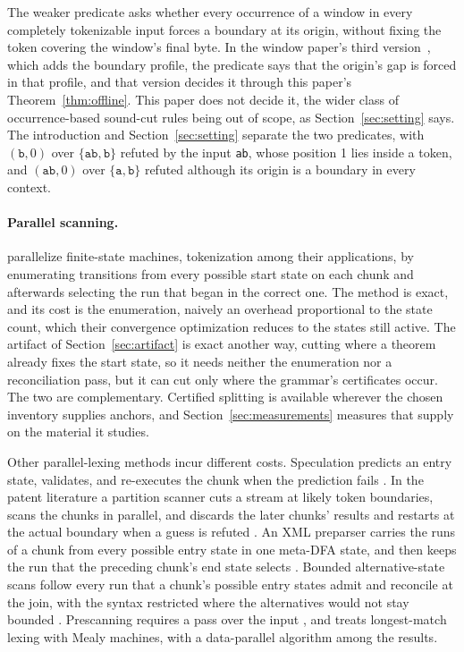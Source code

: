 \documentclass[11pt,a4paper]{article}
\theoremstyle{definition}
\theoremstyle{plain}
\newcommand{\code}[1]{\texttt{#1}}
\begin{document}
The weaker predicate asks whether every occurrence of a window in every completely tokenizable input forces a boundary
at its origin, without fixing the token covering the window's final byte. In the window paper's third
version~\citep{nidhogg2026splitwindows}, which adds the boundary profile, the predicate says that the origin's gap is
forced in that profile, and that version decides it through this paper's Theorem~\ref{thm:offline}. This paper does not
decide it, the wider class of occurrence-based sound-cut rules being out of scope, as Section~\ref{sec:setting} says.
The introduction and Section~\ref{sec:setting} separate the two predicates, with $(\code{b}, 0)$ over
$\{\code{ab}, \code{b}\}$ refuted by the input \code{ab}, whose position 1 lies inside a token, and $(\code{ab}, 0)$
over $\{\code{a}, \code{b}\}$ refuted although its origin is a boundary in every context.

\paragraph{Parallel scanning.} \citet{mytkowicz2014dataparallel} parallelize finite-state machines, tokenization among
their applications, by enumerating transitions from every possible start state on each chunk and afterwards selecting
the run that began in the correct one. The method is exact, and its cost is the enumeration, naively an overhead
proportional to the state count, which their convergence optimization reduces to the states still active. The artifact
of Section~\ref{sec:artifact} is exact another way, cutting where a theorem already fixes the start state, so it needs
neither the enumeration nor a reconciliation pass, but it can cut only where the grammar's certificates occur. The two
are complementary. Certified splitting is available wherever the chosen inventory supplies anchors, and
Section~\ref{sec:measurements} measures that supply on the material it studies.

Other parallel-lexing methods incur different costs. Speculation predicts an entry state, validates, and re-executes the
chunk when the prediction fails \citep{prabhu2010speculative}. In the patent literature a partition scanner cuts a
stream at likely token boundaries, scans the chunks in parallel, and discards the later chunks' results and restarts at
the actual boundary when a guess is refuted \citep{vonpraun2011speculative}. An XML preparser carries the runs of a
chunk from every possible entry state in one meta-DFA state, and then keeps the run that the preceding chunk's end state
selects \citep{pan2007metadfa, chiu2014metadfa}. Bounded alternative-state scans follow every run that a chunk's
possible entry states admit and reconcile at the join, with the syntax restricted where the alternatives would not stay
bounded \citep{barenghi2015parallel}. Prescanning requires a pass over the input \citep{li2021plex}, and
\citet{yang1996mealy} treats longest-match lexing with Mealy machines, with a data-parallel algorithm among the results.
\end{document}
